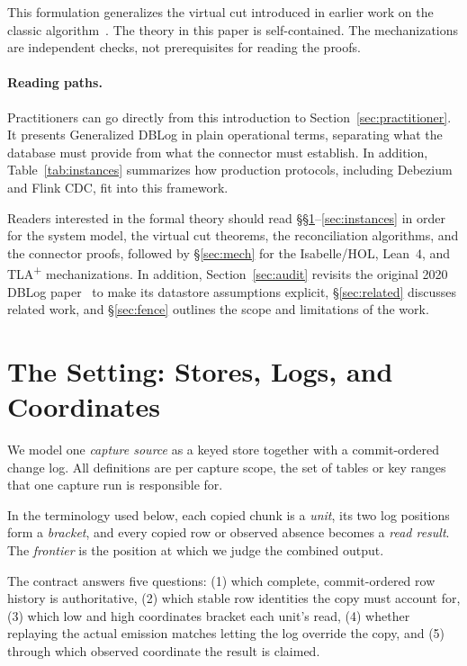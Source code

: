 \documentclass[sigconf,nonacm,10pt]{acmart}
\theoremstyle{plain}
\theoremstyle{definition}
\begin{document}
This formulation generalizes the virtual cut introduced in earlier
work on the classic algorithm~\cite{andreakis2026virtualcuts}.
The theory in this paper is self-contained. The mechanizations are
independent checks, not prerequisites for reading the proofs.

\paragraph{Reading paths.}
Practitioners can go directly from this introduction to Section~\ref{sec:practitioner}. It
presents Generalized DBLog in plain operational terms, separating what the
database must provide from what the connector must establish.
In addition, Table~\ref{tab:instances} summarizes how production
protocols, including Debezium and Flink CDC, fit into this framework.

Readers interested in the formal theory should read
\S\S\ref{sec:setting}--\ref{sec:instances} in order for the system model,
the virtual cut theorems, the reconciliation algorithms, and the connector
proofs, followed by \S\ref{sec:mech} for the Isabelle/HOL, Lean~4, and
TLA\textsuperscript{+} mechanizations. In addition,
Section~\ref{sec:audit} revisits the original 2020 DBLog
paper~\cite{andreakis2020dblog} to make its datastore
assumptions explicit, \S\ref{sec:related} discusses related work, and
\S\ref{sec:fence} outlines the scope and limitations of the work.

\clearpage
\section{The Setting: Stores, Logs, and Coordinates}\label{sec:setting}

We model one \emph{capture source} as a keyed store together with a
commit-ordered change log. All definitions are per capture scope,
the set of tables or key ranges that one capture run is responsible
for.

In the terminology used below, each copied chunk is a \emph{unit},
its two log positions form a \emph{bracket}, and every copied row or
observed absence becomes a \emph{read result}. The
\emph{frontier} is the position at which we judge the combined output.

The contract answers five questions: (1) which complete, commit-ordered
row history is authoritative, (2) which stable row identities the copy
must account for, (3) which low and high coordinates bracket each unit's
read, (4) whether replaying the actual emission matches letting the log override
the copy, and (5) through which observed coordinate the result is claimed.
\end{document}
